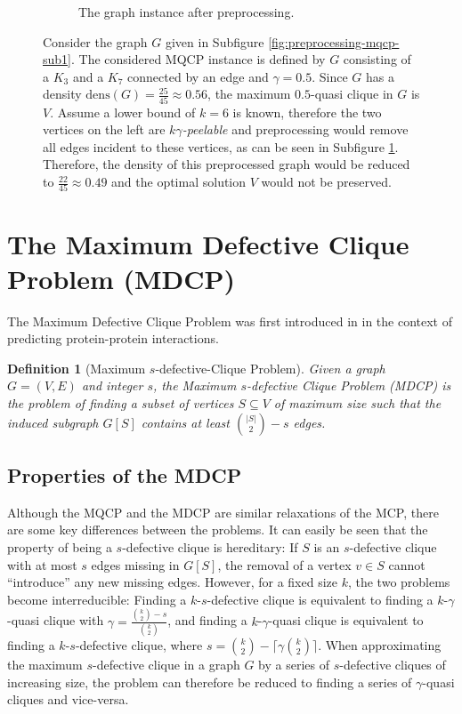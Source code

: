 \documentclass[draft,final]{vutinfth} %
\newtheorem{definition}{Definition}[section]
\begin{document}
\begin{figure}
\begin{subfigure}{.5\textwidth}
      \caption{The graph instance after preprocessing.}
      \label{fig:preprocessing-mqcp-sub2}
    \end{subfigure}
    \caption{Consider the graph $G$ given in Subfigure \ref{fig:preprocessing-mqcp-sub1}. The considered MQCP instance is defined by $G$ consisting of a $K_3$ and a $K_7$ connected by an edge and $\gamma=0.5$. Since $G$ has a density $\mathrm{dens}(G) = \frac{25}{45} \approx 0.56$, the maximum $0.5$-quasi clique in $G$ is $V$. Assume a lower bound of $k=6$ is known, therefore the two vertices on the left are $k\gamma$\emph{-peelable} and preprocessing would remove all edges incident to these vertices, as can be seen in Subfigure \ref{fig:preprocessing-mqcp-sub2}. Therefore, the density of this preprocessed graph would be reduced to $\frac{22}{45} \approx 0.49$ and the optimal solution $V$ would not be preserved.}
    \label{fig:preprocessing-mqcp-counterexample}
\end{figure}

\section{The Maximum Defective Clique Problem (MDCP)}\label{sec:mdcp}

The Maximum Defective Clique Problem was first introduced in \cite{Yu2006} in the context of predicting protein-protein interactions. 

\begin{definition}[Maximum $s$-defective-Clique Problem]
	\label{def:mdcp}
	Given a graph \\ 
    $G = (V,E)$ and integer $s$, the Maximum $s$-defective Clique Problem (MDCP) is the problem of finding a subset of vertices $S \subseteq V$ of maximum size 
	such that the induced subgraph $G[S]$ contains at least $\binom{|S|}{2} - s$ edges. 
\end{definition}

\subsection{Properties of the MDCP}

Although the MQCP and the MDCP are similar relaxations of the MCP, there are some key differences between the problems. It can easily be seen that the property of being a $s$-defective clique is hereditary: If $S$ is an $s$-defective clique with at most $s$ edges missing in $G[S]$, the removal of a vertex $v \in S$ cannot ``introduce'' any new missing edges.  
However, for a fixed size $k$, the two problems become interreducible: 
Finding a $k$-$s$-defective clique is equivalent to finding a $k$-$\gamma$-quasi clique with $\gamma = \frac{\binom{k}{2} - s}{\binom{k}{2}} $, and finding a $k$-$\gamma$-quasi clique is equivalent to finding a $k$-$s$-defective clique, where $s = \binom{k}{2} - \lceil \gamma \binom{k}{2} \rceil$. 
When approximating the maximum $s$-defective clique in a graph $G$ by a series of $s$-defective cliques of increasing size, the problem can therefore be reduced to finding a series of $\gamma$-quasi cliques and vice-versa.
\end{document}
